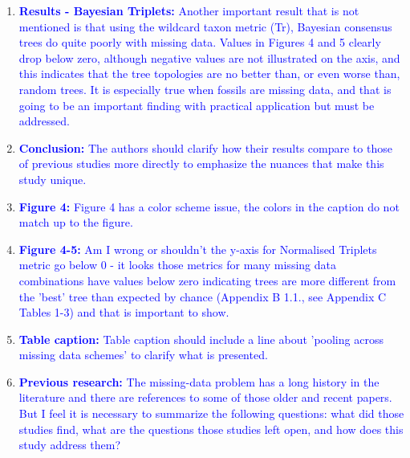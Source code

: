 \documentclass[12pt,letterpaper]{article}
\begin{document}
\begin{enumerate}
\item{\textcolor{blue}{\textbf{Results - Bayesian Triplets:} Another important result that is not mentioned is that using the wildcard taxon metric (Tr), Bayesian consensus trees do quite poorly with missing data.
Values in Figures 4 and 5 clearly drop below zero, although negative values are not illustrated on the axis, and this indicates that the tree topologies are no better than, or even worse than, random trees.
It is especially true when fossils are missing data, and that is going to be an important finding with practical application but must be addressed. }}

\item{\textcolor{blue}{\textbf{Conclusion:} The authors should clarify how their results compare to those of previous studies more directly to emphasize the nuances that make this study unique. }}

\item{\textcolor{blue}{\textbf{Figure 4:} Figure 4 has a color scheme issue, the colors in the caption do not match up to the figure.}}


\item{\textcolor{blue}{\textbf{Figure 4-5:} Am I wrong or shouldn't the y-axis for Normalised Triplets metric go below 0 - it looks those metrics for many missing data combinations have values below zero indicating trees are more different from the 'best' tree than expected by chance (Appendix B 1.1., see Appendix C Tables 1-3) and that is important to show.}}

\item{\textcolor{blue}{\textbf{Table caption:} Table caption should include a line about 'pooling across missing data schemes' to clarify what is presented.}}

\item{\textcolor{blue}{\textbf{Previous research:} The missing-data problem has a long history in the literature and there are references to some of those older and recent papers.
But I feel it is necessary to summarize the following questions: what did those studies find, what are the questions those studies left open, and how does this study address them?}}
\end{enumerate}
\end{document}
